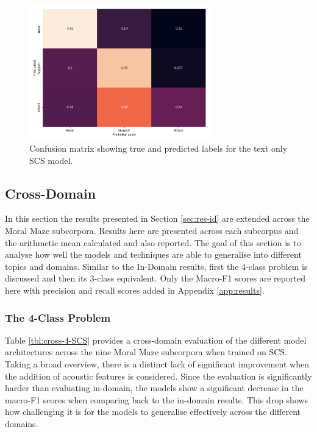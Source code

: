 \documentclass[twocolumn,twoside]{article}
\begin{document}
\begin{figure}[h]
\centering
\includegraphics[width=8cm]{text-only-conf-mat-3class}
\caption{Confusion matrix showing true and predicted labels for the text only SCS model.\label{fig:text-only-conf-mat-3class}}
\end{figure}

\subsection{Cross-Domain}\label{sec:res-cd}

In this section the results presented in Section \ref{sec:res-id} are
extended across the Moral Maze subcorpora. Results here are presented
across each subcorpus and the arithmetic mean calculated and also
reported. The goal of this section is to analyse how well the models and
techniques are able to generalise into different topics and domains.
Similar to the In-Domain results, first the 4-class problem is discussed
and then its 3-class equivalent. Only the Macro-F1 scores are reported
here with precision and recall scores added in Appendix
\ref{app:results}.

\subsubsection{The 4-Class Problem}\label{sec:cd-4class}

Table \ref{tbl:cross-4-SCS} provides a cross-domain evaluation of the
different model architectures across the nine Moral Maze subcorpora when
trained on SCS. Taking a broad overview, there is a distinct lack of
significant improvement when the addition of acoustic features is
considered. Since the evaluation is significantly harder than evaluating
in-domain, the models show a significant decrease in the macro-F1 scores
when comparing back to the in-domain results. This drop shows how
challenging it is for the models to generalise effectively across the
different domains.
\end{document}
